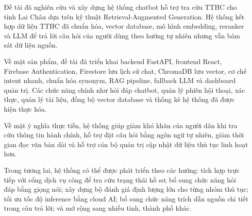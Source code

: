 Đề tài đã nghiên cứu và xây dựng hệ thống chatbot hỗ trợ tra cứu TTHC
cho tỉnh Lai Châu dựa trên kỹ thuật Retrieval-Augmented Generation. Hệ
thống kết hợp dữ liệu TTHC đã chuẩn hóa, vector database, mô hình
embedding, reranker và LLM để trả lời câu hỏi của người dùng theo hướng
tự nhiên nhưng vẫn bám sát dữ liệu nguồn.

Về mặt sản phẩm, đề tài đã triển khai backend FastAPI, frontend React,
Firebase Authentication, Firestore lưu lịch sử chat, ChromaDB lưu
vector, cơ chế intent nhanh, chuẩn hóa synonym, RAG pipeline, fallback
LLM và dashboard quản trị. Các chức năng chính như hỏi đáp chatbot, quản
lý phiên hội thoại, xác thực, quản lý tài liệu, đồng bộ vector database
và thống kê hệ thống đã được hiện thực hóa.

Về mặt ý nghĩa thực tiễn, hệ thống giúp giảm khó khăn của người dân khi
tra cứu thông tin hành chính, hỗ trợ đặt câu hỏi bằng ngôn ngữ tự nhiên,
giảm thời gian đọc văn bản dài và hỗ trợ cán bộ quản trị cập nhật dữ
liệu thủ tục linh hoạt hơn.

Trong tương lai, hệ thống có thể được phát triển theo các hướng: tích
hợp trực tiếp với cổng dịch vụ công để tra cứu trạng thái hồ sơ; bổ sung
chức năng hỏi đáp bằng giọng nói; xây dựng bộ đánh giá định lượng lớn
cho từng nhóm thủ tục; tối ưu tốc độ inference bằng cloud AI; bổ sung
chức năng trích dẫn nguồn chi tiết trong câu trả lời; và mở rộng sang
nhiều tỉnh, thành phố khác.
